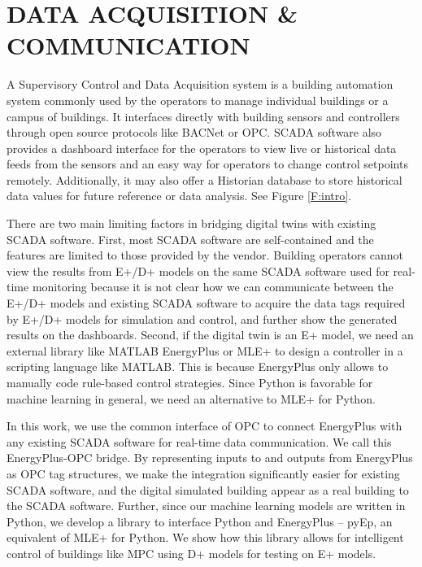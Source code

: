 \section{DATA ACQUISITION \& COMMUNICATION}

A Supervisory Control and Data Acquisition system is a building automation system commonly used by the operators to manage individual buildings or a campus of buildings. 
It interfaces directly with building sensors and controllers through open source protocols like BACNet or OPC. 
SCADA software also provides a dashboard interface for the operators to view live or historical data feeds from the sensors and an easy way for operators to change control setpoints remotely. 
Additionally, it may also offer a Historian database to store historical data values for future reference or data analysis. See Figure \ref{F:intro}.

There are two main limiting factors in bridging digital twins with existing SCADA software.
First, most SCADA software are self-contained and the features are limited to those provided by the vendor.
Building operators cannot view the results from E+/D+ models on the same SCADA software used for real-time monitoring because it is not clear how we can communicate between the E+/D+ models and existing SCADA software to acquire the data tags required by E+/D+ models for simulation and control, and further show the generated results on the dashboards.
Second, if the digital twin is an E+ model, we need an external library like MATLAB EnergyPlus or MLE+ \cite{Nghiem2010} to design a controller in a scripting language like MATLAB. This is because EnergyPlus only allows to manually code rule-based control strategies.
Since Python is favorable for machine learning in general, we need an alternative to MLE+ for Python. 

In this work, we use the common interface of OPC to connect EnergyPlus with any existing SCADA software for real-time data communication. 
We call this EnergyPlus-OPC bridge.
By representing inputs to and outputs from EnergyPlus as OPC tag structures, we make the integration significantly easier for existing SCADA software, and the digital simulated building appear as a real building to the SCADA software.
Further, since our machine learning models are written in Python, we develop a library to interface Python and EnergyPlus -- pyEp, an equivalent of MLE+ for Python.
We show how this library allows for intelligent control of buildings like MPC using D+ models for testing on E+ models.

